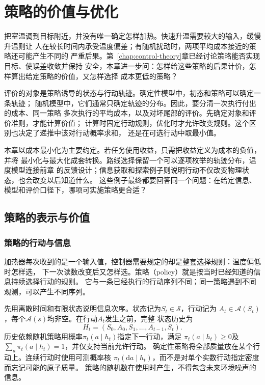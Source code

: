 \chapter{策略的价值与优化}
\label{chap:decision-theory-and-dynamic-risk}
\label{chap:policy-value-and-optimization}

把室温调到目标附近，并没有唯一确定怎样加热。快速升温需要较大的输入，缓慢升温则让
人在较长时间内承受温度偏差；有随机扰动时，两项平均成本接近的策略还可能产生不同的
严重后果。第~\ref{chap:control-theory}章已经讨论策略能否实现目标、使误差收敛并保持
安全，本章进一步问：怎样给这些策略的后果计价，怎样算出给定策略的价值，又怎样选择
成本更低的策略？

评价的对象是策略诱导的状态与行动轨迹。确定性模型中，初态和策略可以确定一条轨迹；
随机模型中，它们通常只确定轨迹的分布。因此，要分清一次执行付出的成本、同一策略
多次执行的平均成本，以及对坏尾部的评价。先确定对象和评价准则，才能计算价值；
计算时固定行动规则，优化时才允许改变规则。这个区别也决定了递推中该对行动概率求和，
还是在可选行动中取最小值。

本章以成本最小化为主要约定。若任务使用收益，只需把收益定义为成本的负值，并将
最小化与最大化成套转换。路线选择保留一个可以逐项枚举的轨迹分布，温度模型连接前章
的反馈设计；信息获取和探索例子则说明行动不仅改变物理状态，也会改变以后知道什么。
这些例子最终都要回答同一个问题：在给定信息、模型和评价口径下，哪项可实施策略更合适？

\section{策略的表示与价值}
\label{sec:policy-representation-and-value}

\subsection{策略的行动与信息}
\label{sec:policy-actions-and-information}

加热器每次收到的是一个输入值，控制器需要规定的却是整套选择规则：温度偏低时怎样选，
下一次读数改变后又怎样选。策略（policy）就是按当时已经知道的信息持续选择行动的规则。
它与一条已经执行的行动序列不同；同一策略遇到不同观测，可以产生不同序列。

先用离散时间和有限状态说明信息次序。状态记为$S_t\in\mathcal S$，行动记为
$A_t\in\mathcal A(S_t)$，每个$\mathcal A(s)$均非空。在行动$A_t$发生之前，完整
状态历史为
\[
  H_t=(S_0,A_0,S_1,\ldots,A_{t-1},S_t).
\]
历史依赖随机策略用概率$\pi_t(a\mid h_t)$指定下一行动，满足
$\pi_t(a\mid h_t)\geq0$及$\sum_a\pi_t(a\mid h_t)=1$，并仅支持当前允许行动。
确定性策略将全部质量放在某个行动上。连续行动时使用可测概率核
$\pi_t(\mathrm da\mid h_t)$，而不是对单个实数行动指定密度而忘记可能的原子质量。
策略的随机数在使用时产生，不得包含未来环境噪声的信息。

